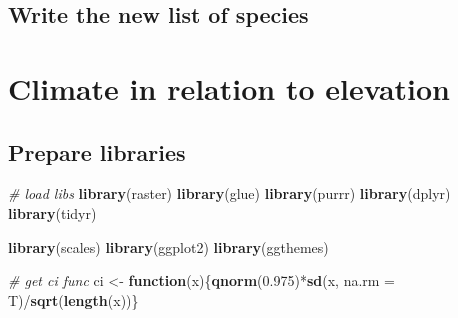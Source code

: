 \documentclass[]{article}
\newenvironment{Shaded}{}{}
\newcommand{\CommentTok}[1]{\textcolor[rgb]{0.38,0.63,0.69}{\textit{#1}}}
\newcommand{\ControlFlowTok}[1]{\textcolor[rgb]{0.00,0.44,0.13}{\textbf{#1}}}
\newcommand{\DataTypeTok}[1]{\textcolor[rgb]{0.56,0.13,0.00}{#1}}
\newcommand{\FloatTok}[1]{\textcolor[rgb]{0.25,0.63,0.44}{#1}}
\newcommand{\KeywordTok}[1]{\textcolor[rgb]{0.00,0.44,0.13}{\textbf{#1}}}
\newcommand{\NormalTok}[1]{#1}
\newcommand{\OperatorTok}[1]{\textcolor[rgb]{0.40,0.40,0.40}{#1}}
\newcommand{\StringTok}[1]{\textcolor[rgb]{0.25,0.44,0.63}{#1}}
\begin{document}
\hypertarget{write-the-new-list-of-species}{%
\subsection{Write the new list of species}\label{write-the-new-list-of-species}}

\begin{Shaded}
\end{Shaded}

\hypertarget{climate-in-relation-to-elevation}{%
\section{Climate in relation to elevation}\label{climate-in-relation-to-elevation}}

\hypertarget{prepare-libraries-2}{%
\subsection{Prepare libraries}\label{prepare-libraries-2}}

\begin{Shaded}
\begin{Highlighting}[]
\CommentTok{# load libs}
\KeywordTok{library}\NormalTok{(raster)}
\KeywordTok{library}\NormalTok{(glue)}
\KeywordTok{library}\NormalTok{(purrr)}
\KeywordTok{library}\NormalTok{(dplyr)}
\KeywordTok{library}\NormalTok{(tidyr)}

\KeywordTok{library}\NormalTok{(scales)}
\KeywordTok{library}\NormalTok{(ggplot2)}
\KeywordTok{library}\NormalTok{(ggthemes)}

\CommentTok{# get ci func}
\NormalTok{ci <-}\StringTok{ }\ControlFlowTok{function}\NormalTok{(x)\{}\KeywordTok{qnorm}\NormalTok{(}\FloatTok{0.975}\NormalTok{)}\OperatorTok{*}\KeywordTok{sd}\NormalTok{(x, }\DataTypeTok{na.rm =}\NormalTok{ T)}\OperatorTok{/}\KeywordTok{sqrt}\NormalTok{(}\KeywordTok{length}\NormalTok{(x))\}}
\end{Highlighting}
\end{Shaded}
\end{document}
